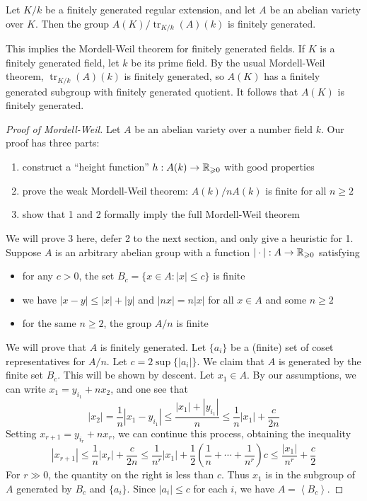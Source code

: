 \documentclass{article}
\begin{document}
\begin{theorem}
Let $K/k$ be a finitely generated regular extension, and let $A$ be an abelian 
variety over $K$. Then the group $A(K)/\operatorname{tr}_{K/k}(A)(k)$ is 
finitely generated.
\end{theorem}

This implies the Mordell-Weil theorem for finitely generated fields. If $K$ is 
a finitely generated field, let $k$ be its prime field. By the usual 
Mordell-Weil theorem, $\operatorname{tr}_{K/k}(A)(k)$ is finitely generated, 
so $A(K)$ has a finitely generated subgroup with finitely generated quotient. 
It follows that $A(K)$ is finitely generated.

\begin{proof}[Proof of Mordell-Weil]
Let $A$ be an abelian variety over a number field $k$. Our proof has three 
parts:
\begin{enumerate}
  \item construct a ``height function'' $h:A(k)\to \mathbb{R}_{\geqslant 0}$ 
    with good properties
  \item prove the weak Mordell-Weil theorem: $A(k)/n A(k)$ is finite for all 
    $n\geqslant 2$
  \item show that 1 and 2 formally imply the full Mordell-Weil theorem 
\end{enumerate}
We will prove 3 here, defer 2 to the next section, and only give a heuristic 
for 1. Suppose $A$ is an arbitrary abelian group with a function 
$|\cdot|:A\to \mathbb{R}_{\geqslant 0}$ satisfying 
\begin{itemize}
  \item for any $c>0$, the set $B_c = \{x\in A:|x|\leqslant c\}$ 
    is finite
  \item we have $|x-y|\leqslant |x|+|y|$ and $|n x|=n |x|$ for all 
    $x\in A$ and some $n\geqslant 2$
  \item for the same $n\geqslant 2$, the group $A/n$ is finite
\end{itemize}
We will prove that $A$ is finitely generated. Let $\{a_i\}$ be a (finite) set 
of coset representatives for $A/n$. Let $c=2\sup \{|a_i|\}$. We claim that $A$ 
is generated by the finite set $B_c$. This will be shown by 
descent. Let $x_1\in A$. By our assumptions, we can write 
$x_1 = y_{i_1} + n x_2$, and one see that 
\[
  |x_2| = \frac 1 n |x_1 - y_{i_1}| 
    \leqslant \frac{|x_1| + |y_{i_1}|}{n} 
    \leqslant \frac 1 n |x_1| + \frac{c}{2 n}
\]
Setting $x_{r+1} = y_{i_r} + n x_r$, we can continue this process, obtaining 
the inequality 
\[
  |x_{r+1}| \leqslant \frac 1 n |x_r| + \frac{c}{2 n}
    \leqslant \frac{1}{n^r} |x_1| + \frac 1 2\left(\frac 1 n + \cdots + \frac{1}{n^r}\right) c 
    \leqslant \frac{|x_1|}{n^r} + \frac c 2
\]
For $r\gg 0$, the quantity on the right is less than $c$. Thus $x_1$ is in the 
subgroup of $A$ generated by $B_c$ and $\{a_i\}$. Since $|a_i|\leqslant c$ for 
each $i$, we have $A=\left\langle B_c\right\rangle$. 
\end{proof}
\end{document}
